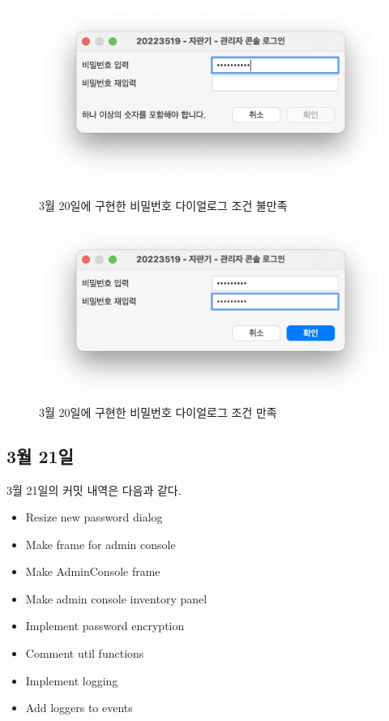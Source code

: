 \documentclass{oblivoir}
\begin{document}
    \begin{figure}[h]
        \centering
        \begin{minipage}{.5\textwidth}
            \includegraphics[width=\textwidth]{0320-password-dialog-1.png}
            \caption{3월 20일에 구현한 비밀번호 다이얼로그 조건 불만족}
            \label{fig:0320-password-dialog-1}
        \end{minipage}%
        \begin{minipage}{.5\textwidth}
            \includegraphics[width=\textwidth]{0320-password-dialog-2.png}
            \caption{3월 20일에 구현한 비밀번호 다이얼로그 조건 만족}
            \label{fig:0320-password-dialog-2}
        \end{minipage}
    \end{figure}

    \subsection{3월 21일}

    3월 21일의 커밋 내역은 다음과 같다.
    
    \begin{itemize}
        \item Resize new password dialog
        \item Make frame for admin console
        \item Make AdminConsole frame
        \item Make admin console inventory panel
        \item Implement password encryption
        \item Comment util functions
        \item Implement logging
        \item Add loggers to events
    \end{itemize}
\end{document}
